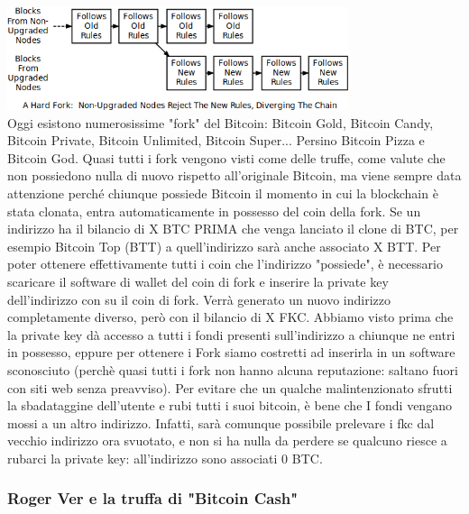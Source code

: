 \documentclass {article}
\begin{document}
{\vspace {0.5cm}
\includegraphics [width = 10cm] {media/hard_fork.png}
\vspace {0.5cm}
\\
Oggi esistono numerosissime "fork" del Bitcoin: Bitcoin Gold, Bitcoin Candy, Bitcoin Private, Bitcoin Unlimited, Bitcoin Super... Persino Bitcoin Pizza e Bitcoin God.
Quasi tutti i fork vengono visti come delle truffe, come valute che non possiedono nulla di nuovo rispetto all'originale Bitcoin, ma viene sempre data attenzione perché chiunque possiede Bitcoin il momento in cui la blockchain è stata clonata, entra automaticamente in possesso del coin della fork.
Se un indirizzo ha il bilancio di X BTC PRIMA che venga lanciato il clone di BTC, per esempio Bitcoin Top (BTT) a quell'indirizzo sarà anche associato X BTT.
Per poter ottenere effettivamente tutti i coin che l'indirizzo "possiede", è necessario scaricare il software di wallet del coin di fork e inserire la private key dell'indirizzo con su il coin di fork.
Verrà generato un nuovo indirizzo completamente diverso, però con il bilancio di X FKC.
Abbiamo visto prima che la private key dà accesso a tutti i fondi presenti sull'indirizzo a chiunque ne entri in possesso, eppure per ottenere i Fork siamo costretti ad inserirla in un software sconosciuto (perchè quasi tutti i fork non hanno alcuna reputazione: saltano fuori con siti web senza preavviso).
Per evitare che un qualche malintenzionato sfrutti la sbadataggine dell'utente e rubi tutti i suoi bitcoin, è bene che I fondi vengano mossi a un altro indirizzo.
Infatti, sarà comunque possibile prelevare i fkc dal vecchio indirizzo ora svuotato, e non si ha nulla da perdere se qualcuno riesce a rubarci la private key: all'indirizzo sono associati 0 BTC.


\subsubsection {Roger Ver e la truffa di "Bitcoin Cash"}


}
\end{document}
